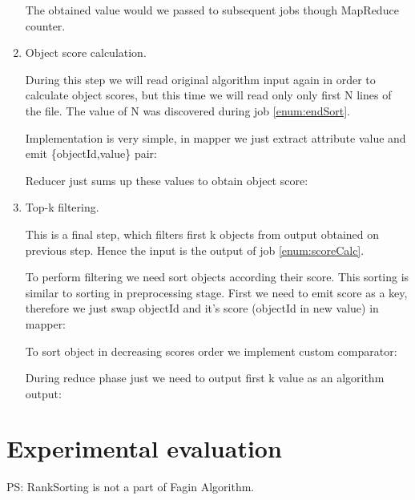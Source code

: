 \documentclass[a4paper]{article}
\begin{document}
\begin{enumerate}
    The obtained value would we passed to subsequent jobs though MapReduce counter.

    \item Object score calculation.
    \label{enum:scoreCalc}

    During this step we will read original algorithm input again in order to calculate object scores, but this time we will read only only first N lines of the file. 
    The value of N was discovered during job \ref{enum:endSort}.

    Implementation is very simple, in mapper we just extract attribute value and emit \{objectId,value\} pair:
    

    Reducer just sums up these values to obtain object score:
    

    \item Top-k filtering.

    This is a final step, which filters first k objects from output obtained on previous step.
    Hence the input is the output of job \ref{enum:scoreCalc}.

    To perform filtering we need sort objects according their score.
    This sorting is similar to sorting in preprocessing stage.
    First we need to emit score as a key, therefore we just swap objectId and it's score (objectId in new value) in mapper:
    

    To sort object in decreasing scores order we implement custom comparator:
    

    During reduce phase just we need to output first k value as an algorithm output:
    
\end{enumerate}

\section{Experimental evaluation}
\label{sec:experiments}

PS: RankSorting is not a part of Fagin Algorithm.
\end{document}
